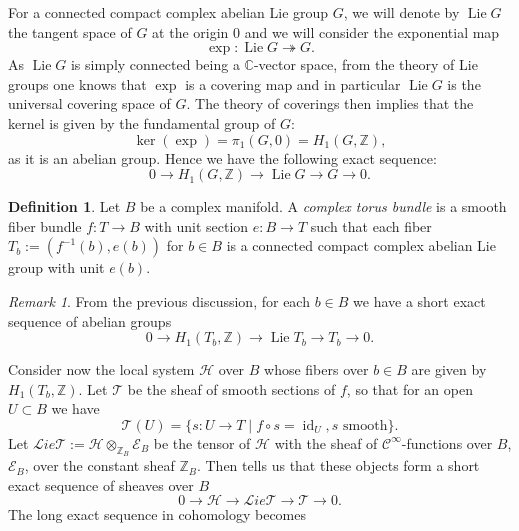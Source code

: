 \documentclass[a4paper,12 pt,titlepage,twoside]{book}
\newcommand{\numberset}{\mathbb}
\newcommand{\Z}{\numberset{Z}}
\newcommand{\C}{\numberset{C}}
\newcommand{\Lie}{\mathcal{L}ie}
\DeclareMathOperator{\id}{id}
\DeclareMathOperator{\lie}{Lie}
\theoremstyle{plain}
\theoremstyle{theorem}
\theoremstyle{definition}
\newtheorem{defn}[thm]{Definition}
\theoremstyle{remark}
\newtheorem{oss}[thm]{Remark}
\begin{document}
	For a connected compact complex abelian Lie group $G$, we will denote by $\lie G$ the tangent space of $G$ at the origin $0$ and we will consider the exponential map $$\exp \colon \lie G \twoheadrightarrow G.$$
	As $\lie G$ is simply connected being a $\C$-vector space, from the theory of Lie groups one knows that $\exp$ is a covering map and in particular $\lie G$ is the universal covering space of $G$. The theory of coverings then implies that the kernel is given by the fundamental group of $G$: $$\ker(\exp) = \pi_1(G,0) = H_1(G,\Z),$$ as it is an abelian group. Hence we have the following exact sequence: $$0 \rightarrow H_1(G,\Z) \rightarrow \lie G \rightarrow G \rightarrow 0.$$
	\begin{defn}
		Let $B$ be a complex manifold. A \emph{complex torus bundle} is a smooth fiber bundle $f \colon T \rightarrow B$ with unit section $e \colon B \rightarrow T$ such that each fiber $T_b := (f^{-1}(b), e(b))$ for $b \in B$ is a connected compact complex abelian Lie group with unit $e(b).$
	\end{defn}
	\begin{oss}
		From the previous discussion, for each $ b \in B$ we have a short exact sequence of abelian groups $$0 \rightarrow H_1(T_b, \Z) \rightarrow \lie T_b \rightarrow T_b \rightarrow 0.$$
	\end{oss}
	Consider now the local system $\mathcal{H}$ over $B$ whose fibers over $b \in B$ are given by $H_1(T_b, \Z)$. Let $\mathcal{T}$ be the sheaf of smooth sections of $f$, so that for an open $U \subset B$ we have $$\mathcal{T}(U) = \{s \colon U \rightarrow T \mid f\circ s = \id_U, s \text{ smooth}\}.$$ Let $\Lie \mathcal{T} := \mathcal{H} \otimes_{\Z_B} \mathcal{E}_B$ be the tensor of $\mathcal{H}$ with the sheaf of $\mathcal{C}^\infty$-functions over $B$, $\mathcal{E}_B$, over the constant sheaf $\Z_B$. Then \cite{MR3184171} tells us that these objects form a short exact sequence of sheaves over $B$ \begin{equation}\label{ses sheaves}
	0 \rightarrow \mathcal{H} \rightarrow \Lie \mathcal{T} \rightarrow \mathcal{T} \rightarrow 0.
	\end{equation} 
	The long exact sequence in cohomology becomes 
	\begin{center}
	\end{center}
\end{document}
